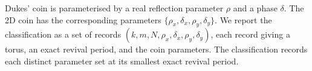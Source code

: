 Dukes' coin is parameterised by a real reflection parameter $\rho$
and a phase $\delta$. The 2D coin has the corresponding
parameters $\{\rho_x, \delta_x, \rho_y, \delta_y\}$. We report the
classification as a set of records
$(k, m, N, \rho_x, \delta_x, \rho_y, \delta_y)$, each record giving a
torus, an exact revival period, and the coin parameters. The 
classification records each distinct parameter set at its smallest
exact revival period.

